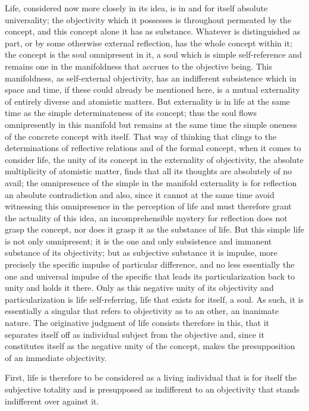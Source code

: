 Life, considered now more closely in its idea,
is in and for itself absolute universality;
the objectivity which it possesses is
throughout permeated by the concept,
and this concept alone it has as substance.
Whatever is distinguished as part,
or by some otherwise external reflection,
has the whole concept within it;
the concept is the soul omnipresent in it,
a soul which is simple self-reference
and remains one in the manifoldness
that accrues to the objective being.
This manifoldness, as self-external objectivity,
has an indifferent subsistence which in space and time,
if these could already be mentioned here,
is a mutual externality of entirely
diverse and atomistic matters.
But externality is in life at the same time
as the simple determinateness of its concept;
thus the soul flows omnipresently in this manifold
but remains at the same time the simple oneness
of the concrete concept with itself.
That way of thinking that clings to the determinations of
reflective relations and of the formal concept,
when it comes to consider life,
the unity of its concept in the externality of objectivity,
the absolute multiplicity of atomistic matter,
finds that all its thoughts are absolutely of no avail;
the omnipresence of the simple in the manifold externality
is for reflection an absolute contradiction
and also, since it cannot at the same time avoid
witnessing this omnipresence in the perception of life
and must therefore grant the actuality of this idea,
an incomprehensible mystery
for reflection does not grasp the concept,
nor does it grasp it as the substance of life.
But this simple life is not only omnipresent;
it is the one and only subsistence
and immanent substance of its objectivity;
but as subjective substance it is impulse,
more precisely the specific impulse of particular difference,
and no less essentially the one and universal impulse
of the specific that leads its particularization
back to unity and holds it there.
Only as this negative unity of its
objectivity and particularization is life self-referring,
life that exists for itself, a soul.
As such, it is essentially a singular that refers to
objectivity as to an other, an inanimate nature.
The originative judgment of life consists therefore in this,
that it separates itself off as individual subject from the objective
and, since it constitutes itself as the negative unity of the concept,
makes the presupposition of an immediate objectivity.

First, life is therefore to be considered as a living individual
that is for itself the subjective totality
and is presupposed as indifferent to an objectivity
that stands indifferent over against it.

